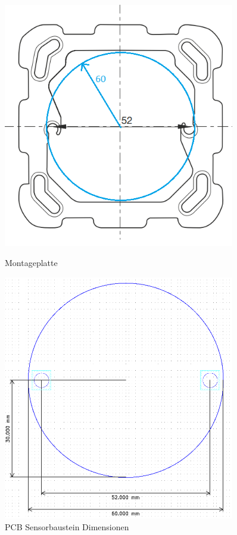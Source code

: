 \begin{figure}[htb]
	\centering
	\begin{minipage}[t]{0.45\linewidth}
		\centering
		\includegraphics[width=0.9\textwidth]{graphics/Montageplatte.png}
		\caption{Montageplatte \cite{hager_hager_kat1_08_technik_d_2019} }
		\label{pic: Montageplatte.png}
	\end{minipage}%
	\hfill
	\begin{minipage}[t]{0.45\linewidth}
		\centering
		\includegraphics[width=0.90\textwidth]{graphics/pcb_sensor_dimensionen.png}
		\caption{PCB Sensorbaustein Dimensionen}
		\label{pic: pcb_sensor_dimensionen.png}
	\end{minipage}
\end{figure}

